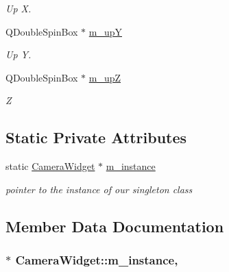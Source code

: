 \begin{DoxyCompactItemize}
\begin{DoxyCompactList}\small\item\em Up X. \end{DoxyCompactList}\item 
\hypertarget{class_camera_widget_ae547efffd14b050165628ca508d65619}{Q\-Double\-Spin\-Box $\ast$ \hyperlink{class_camera_widget_ae547efffd14b050165628ca508d65619}{m\-\_\-up\-Y}}\label{class_camera_widget_ae547efffd14b050165628ca508d65619}

\begin{DoxyCompactList}\small\item\em Up Y. \end{DoxyCompactList}\item 
\hypertarget{class_camera_widget_af6ff3de049f5174aa3072e8f5efaa506}{Q\-Double\-Spin\-Box $\ast$ \hyperlink{class_camera_widget_af6ff3de049f5174aa3072e8f5efaa506}{m\-\_\-up\-Z}}\label{class_camera_widget_af6ff3de049f5174aa3072e8f5efaa506}

\begin{DoxyCompactList}\small\item\em Z \end{DoxyCompactList}\end{DoxyCompactItemize}
\subsection*{Static Private Attributes}
\begin{DoxyCompactItemize}
\item 
static \hyperlink{class_camera_widget}{Camera\-Widget} $\ast$ \hyperlink{class_camera_widget_afa9cb153c3153472ed53bd5428753fe4}{m\-\_\-instance}
\begin{DoxyCompactList}\small\item\em pointer to the instance of our singleton class \end{DoxyCompactList}\end{DoxyCompactItemize}


\subsection{Member Data Documentation}
\hypertarget{class_camera_widget_afa9cb153c3153472ed53bd5428753fe4}{
\subsubsection[{m\-\_\-instance}]{ $\ast$ Camera\-Widget\-::m\-\_\-instance\hspace{0.3cm}{\ttfamily [static]}, {\ttfamily [private]}}}\label{class_camera_widget_afa9cb153c3153472ed53bd5428753fe4}



